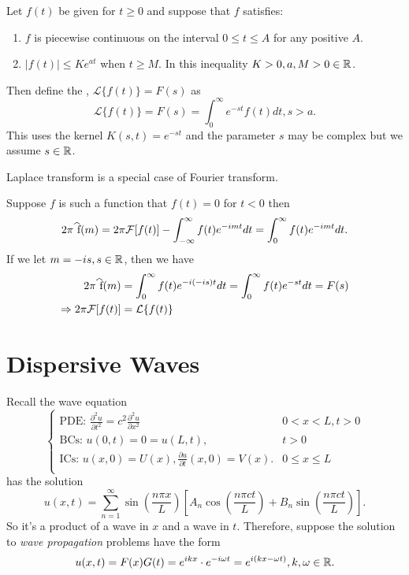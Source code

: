 \documentclass[class=article,crop=false]{standalone}
\begin{document}
\begin{defn}
	Let $ f(t)$ be given for  $ t\geq 0$ and suppose that  $ f$ satisfies:
	 \begin{enumerate}[label=\arabic*)]
		\item $ f$ is piecewise continuous on the interval  $ 0 \leq t \leq A$ for any positive  $ A$.
		\item $|f(t)|\leq K e^{at}$ when $ t \geq M$. In this inequality  $ K>0,a,M>0 \in \mathbb{R}$.
	\end{enumerate}
	Then define the , $ \mathcal{ L} \{f(t)\} = F(s)$ as
	\[
		\mathcal{ L}\{f(t)\} = F(s) = \int_{0}^{\infty} e^{-st} f(t) dt, s>a
	.\] 
	This uses the kernel $ K(s,t) = e^{-st}$ and the parameter $ s$ may be complex but we assume  $ s \in \mathbb{R}$.
\end{defn}

\begin{claim}[]
Laplace transform is a special case of Fourier transform.
\end{claim}

\begin{prf}
	Suppose $ f$ is such a function that  $ f(t) = 0$ for  $ t<0$ then
	 \[
		 2\pi \wh{ f}(m) = 2\pi \mathcal{ F}[f(t)] - \int_{-\infty}^{\infty} f(t) e^{-imt} dt = \int_{0}^{\infty} f(t) e^{-imt} dt 
	.\] 
	If we let $ m=-is, s \in \mathbb{R}$, then we have
	\begin{align*}
		2\pi \wh{ f}(m) &= \int_{0}^{\infty} f(t) e^{-i(-is)t} dt = \int_{0}^{\infty} f(t) e^{-st} dt = F(s) \\
		\implies		2\pi \mathcal{ F}[f(t)] &= \mathcal{ L}\{f(t)\}   
	\end{align*} 
\end{prf}

\newpage
\section{Dispersive Waves}

Recall the wave equation
\begin{equation*}
\begin{cases}
	\text{PDE: } \frac{\partial^2 u}{\partial { t}^2} = c^2 \frac{\partial^2 u}{\partial { x}^2}  & 0<x<L, t>0 \\
	\text{BCs: } u(0,t)=0=u(L,t), & t>0 \\
	\text{ICs: } u(x,0) = U(x), \frac{\partial u}{\partial t} (x,0) = V(x).  & 0 \leq x \leq L \\
\end{cases}
\end{equation*}
has the solution
\[
	u(x,t) = \sum_{ n= 1}^{\infty} \sin \left( \frac{ n\pi x}{ L} \right) \left[ A_n \cos \left( \frac{ n\pi c t}{ L} \right) + B_n \sin \left( \frac{ n\pi c t}{ L} \right)  \right] 
.\] 
So it's a product of a wave in $ x$ and a wave in  $ t$. Therefore, suppose the solution to  \emph{wave propagation} problems have the form
\[
	u(x,t) = F(x) G(t) = e^{ikx} \cdot e^{-i\omega t}= e^{i(kx- \omega t)}, k, \omega \in \mathbb{R}
.\] 
\end{document}
